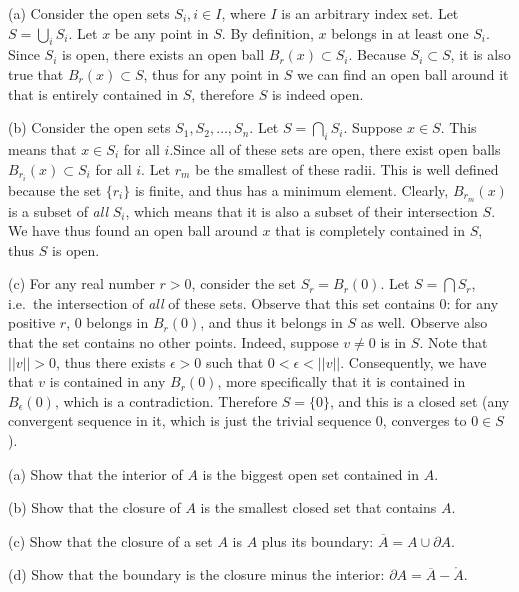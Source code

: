 \begin{solution}

    (a) Consider the open sets $S_i, i \in I$, where $I$ is an arbitrary index set. Let $S = \bigcup_{i}S_i$. Let $x$ be any point in $S$. By definition, $x$ belongs in at least one $S_i$. Since $S_i$ is open, there exists an open ball $B_r(x) \subset S_i$. Because $S_i \subset S$, it is also true that $B_r(x) \subset S$, thus for any point in $S$ we can find an open ball around it that is entirely contained in $S$, therefore $S$ is indeed open.

    (b) Consider the open sets $S_1, S_2, \ldots, S_n$. Let $S = \bigcap_{i} S_i$. Suppose $x \in S$. This means that $x \in S_i$ for all $i$.Since all of these sets are open, there exist open balls $B_{r_i}(x) \subset S_i$ for all $i$. Let $r_m$ be the smallest of these radii. This is well defined because the set $\{r_i\}$ is finite, and thus has a minimum element. Clearly, $B_{r_m}(x)$ is a subset of \textit{all} $S_i$, which means that it is also a subset of their intersection $S$. We have thus found an open ball around $x$ that is completely contained in $S$, thus $S$ is open.

    (c) For any real number $r > 0$, consider the set $S_r = B_r(0)$. Let $S = \bigcap S_r$, i.e.\ the intersection of \textit{all} of these sets. Observe that this set contains 0: for any positive $r$, 0 belongs in $B_r(0)$, and thus it belongs in $S$ as well. Observe also that the set contains no other points. Indeed, suppose $v \neq 0$ is in $S$. Note that $\lvert \lvert v \rvert \rvert > 0$, thus there exists $\epsilon > 0$ such that $0 < \epsilon < \lvert \lvert v \rvert \rvert$. Consequently, we have that $v$ is contained in any $B_r(0)$, more specifically that it is contained in $B_{\epsilon}(0)$, which is a contradiction. Therefore $S = \{0\}$, and this is a closed set (any convergent sequence in it, which is just the trivial sequence 0, converges to $0 \in S$).
\end{solution}

\begin{exercise}{4}
    (a) Show that the interior of $A$ is the biggest open set contained in $A$.

    (b) Show that the closure of $A$ is the smallest closed set that contains $A$.

    (c) Show that the closure of a set $A$ is $A$ plus its boundary: $\overline{A} = A \cup \partial{A}$.

    (d) Show that the boundary is the closure minus the interior: $\partial{A} = \overline{A} - \mathring{A}$.
\end{exercise}

